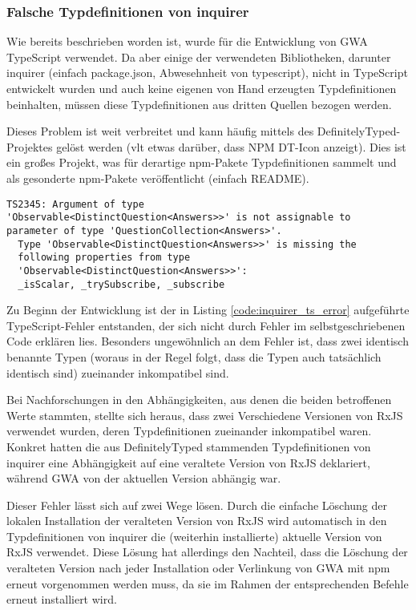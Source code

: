 \subsubsection{Falsche Typdefinitionen von inquirer}
Wie bereits beschrieben worden ist, wurde für die Entwicklung von \gls{GWA} TypeScript verwendet. Da aber einige der verwendeten Bibliotheken, darunter inquirer \missingQuote (einfach package.json, Abwesehnheit von typescript), nicht in TypeScript entwickelt wurden und auch keine eigenen von Hand erzeugten Typdefinitionen beinhalten, müssen diese Typdefinitionen aus dritten Quellen bezogen werden.

Dieses Problem ist weit verbreitet und kann häufig mittels des DefinitelyTyped-Projektes gelöst werden \missingQuote (vlt etwas darüber, dass NPM DT-Icon anzeigt). Dies ist ein großes Projekt, was für derartige \gls{npm}-Pakete Typdefinitionen sammelt und als gesonderte \gls{npm}-Pakete veröffentlicht \missingQuote (einfach README).

\begin{lstlisting}[caption={TypeScript-Fehlermeldung bei der Verwendung von inquirer mit einem RxJS-Observable}, captionpos=b, label={code:inquirer_ts_error}]
TS2345: Argument of type
'Observable<DistinctQuestion<Answers>>' is not assignable to
parameter of type 'QuestionCollection<Answers>'.
  Type 'Observable<DistinctQuestion<Answers>>' is missing the
  following properties from type
  'Observable<DistinctQuestion<Answers>>':
  _isScalar, _trySubscribe, _subscribe
\end{lstlisting}

Zu Beginn der Entwicklung ist der in Listing \ref{code:inquirer_ts_error} aufgeführte TypeScript-Fehler entstanden, der sich nicht durch Fehler im selbstgeschriebenen Code erklären lies. Besonders ungewöhnlich an dem Fehler ist, dass zwei identisch benannte Typen (woraus in der Regel folgt, dass die Typen auch tatsächlich identisch sind) zueinander inkompatibel sind.

Bei Nachforschungen in den Abhängigkeiten, aus denen die beiden betroffenen Werte stammten, stellte sich heraus, dass zwei Verschiedene Versionen von RxJS verwendet wurden, deren Typdefinitionen zueinander inkompatibel waren. Konkret hatten die aus DefinitelyTyped stammenden Typdefinitionen von inquirer eine Abhängigkeit auf eine veraltete Version von RxJS deklariert, während \gls{GWA} von der aktuellen Version abhängig war.

Dieser Fehler lässt sich auf zwei Wege lösen. Durch die einfache Löschung der lokalen Installation der veralteten Version von RxJS wird automatisch in den Typdefinitionen von inquirer die (weiterhin installierte) aktuelle Version von RxJS verwendet. Diese Lösung hat allerdings den Nachteil, dass die Löschung der veralteten Version nach jeder Installation oder Verlinkung von \gls{GWA} mit \gls{npm} erneut vorgenommen werden muss, da sie im Rahmen der entsprechenden Befehle erneut installiert wird.

